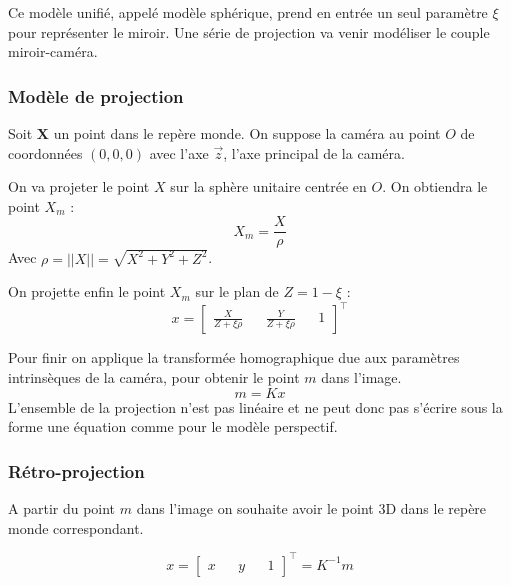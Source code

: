 Ce modèle unifié, appelé modèle sphérique, prend en entrée un seul paramètre $\xi$ pour représenter le miroir.
Une série de projection va venir modéliser le couple miroir-caméra.


\subsubsection{Modèle de projection}

Soit $\mathbf{X}$ un point dans le repère monde.
On suppose la caméra au point $O$ de coordonnées $(0,0,0)$ avec l'axe $\vec{z}$, l'axe principal de la caméra.

On va projeter le point $X$ sur la sphère unitaire centrée en $O$. On obtiendra le point $X_m$ :
\begin{equation}
X_m = \frac{X}{\rho}
\end{equation}
Avec $\rho = ||X|| = \sqrt{X^2+Y^2+Z^2}$.

On projette enfin le point $X_m$ sur le plan de $Z = 1 - \xi$ :
\begin{equation}
x = \begin{bmatrix}  \frac{X}{Z+\xi \rho} && \frac{Y}{Z +\xi \rho} && 1 \end{bmatrix}^{\top}
\end{equation}

Pour finir on applique la transformée homographique due aux paramètres intrinsèques de la caméra, pour obtenir le point $m$ dans l'image.
\begin{equation}
m= K x
\end{equation}
L'ensemble de la projection n'est pas linéaire et ne peut donc pas s'écrire sous la forme une équation comme pour le modèle perspectif.

\subsubsection{Rétro-projection}

A partir du point $m$ dans l'image on souhaite avoir le point 3D dans le repère monde correspondant.

\begin{equation}
x = \begin{bmatrix} x && y && 1 \end{bmatrix}^{\top} = K^{-1} m
\end{equation}

